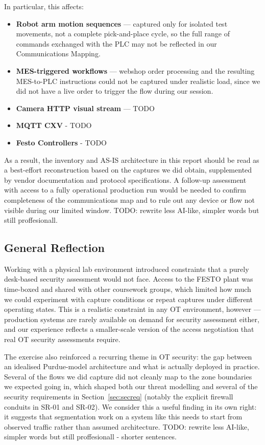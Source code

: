 \documentclass[11pt,a4paper]{article}
\begin{document}
In particular, this affects:
\begin{itemize}
    \item \textbf{Robot arm motion sequences} — captured only for isolated test
        movements, not a complete pick-and-place cycle, so the full range of
        commands exchanged with the PLC may not be reflected in our
        Communications Mapping.

    \item \textbf{MES-triggered workflows} — webshop order processing and the
        resulting MES-to-PLC instructions could not be captured under realistic
        load, since we did not have a live order to trigger the flow during our
        session.

    \item \textbf{Camera HTTP visual stream} —  TODO
    \item \textbf{MQTT CXV} - TODO
    \item \textbf{Festo Controllers} - TODO
\end{itemize}

As a result, the inventory and AS-IS architecture in this report should be read
as a best-effort reconstruction based on the captures we did obtain,
supplemented by vendor documentation and protocol specifications. A follow-up
assessment with access to a fully operational production run would be needed to
confirm completeness of the communications map and to rule out any device or
flow not visible during our limited window.
TODO: rewrite less AI-like, simpler words but still proffesionall.

\subsection{General Reflection}
Working with a physical lab environment introduced constraints that a purely
desk-based security assessment would not face. Access to the FESTO plant was
time-boxed and shared with other coursework groups, which limited how much we
could experiment with capture conditions or repeat captures under different
operating states. This is a realistic constraint in any OT environment, however
— production systems are rarely available on demand for security assessment
either, and our experience reflects a smaller-scale version of the access
negotiation that real OT security assessments require.

The exercise also reinforced a recurring theme in OT security: the gap between
an idealised Purdue-model architecture and what is actually deployed in
practice. Several of the flows we did capture did not cleanly map to the zone
boundaries we expected going in, which shaped both our threat modelling and
several of the security requirements in Section~\ref{sec:secreq} (notably the
explicit firewall conduits in SR-01 and SR-02). We consider this a useful
finding in its own right: it suggests that segmentation work on a system like
this needs to start from observed traffic rather than assumed architecture.
TODO: rewrite less AI-like, simpler words but still proffesionall - shorter
sentences.
\end{document}
